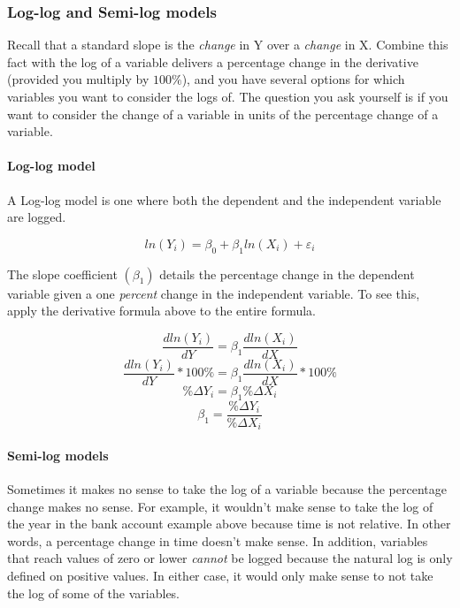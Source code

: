 \documentclass[
]{book}
\begin{document}
\hypertarget{log-log-and-semi-log-models}{%
\subsubsection*{Log-log and Semi-log models}\label{log-log-and-semi-log-models}}

Recall that a standard slope is the \emph{change} in Y over a \emph{change} in X. Combine this fact with the log of a variable delivers a percentage change in the derivative (provided you multiply by \(100\%\)), and you have several options for which variables you want to consider the logs of. The question you ask yourself is if you want to consider the change of a variable in units of the percentage change of a variable.

\hypertarget{log-log-model}{%
\paragraph*{Log-log model}\label{log-log-model}}

A Log-log model is one where both the dependent and the independent variable are logged.

\[ln(Y_i)=\beta_0 + \beta_1 ln(X_i) + \varepsilon_i\]

The slope coefficient \((\beta_1)\) details the percentage change in the dependent variable given a one \emph{percent} change in the independent variable. To see this, apply the derivative formula above to the entire formula.

\[\frac{dln(Y_i)}{dY} = \beta_1 \frac{dln(X_i)}{dX}\]
\[\frac{dln(Y_i)}{dY} * 100\% = \beta_1 \frac{dln(X_i)}{dX} * 100\%\]
\[\%\Delta Y_i = \beta_1 \%\Delta X_i\]
\[ \beta_1 =\frac{\%\Delta Y_i}{\%\Delta X_i}\]

\hypertarget{semi-log-models}{%
\paragraph*{Semi-log models}\label{semi-log-models}}

Sometimes it makes no sense to take the log of a variable because the percentage change makes no sense. For example, it wouldn't make sense to take the log of the year in the bank account example above because time is not relative. In other words, a percentage change in time doesn't make sense. In addition, variables that reach values of zero or lower \emph{cannot} be logged because the natural log is only defined on positive values. In either case, it would only make sense to not take the log of some of the variables.
\end{document}
